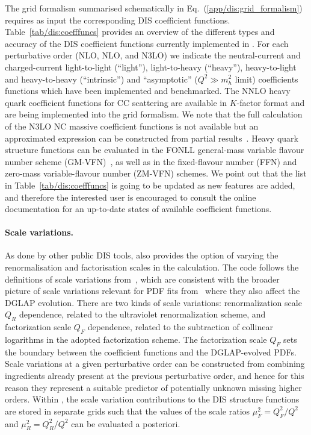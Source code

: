 The grid formalism summarised schematically in Eq.~(\ref{app/dis:grid_formalism})
requires as input the corresponding DIS coefficient functions.
%
Table~\ref{tab/dis:coefffuncs} provides an overview of the different types and accuracy of the DIS coefficient
functions currently implemented in \yadism.
%
For each perturbative order (NLO, NLO, and N3LO)
we indicate  the neutral-current
and charged-current light-to-light (``light''), light-to-heavy (``heavy''), heavy-to-light
and heavy-to-heavy (``intrinsic'') and ``asymptotic'' ($Q^2 \gg m_h^2$ limit)  coefficients functions
which have been implemented and benchmarked.
%
The NNLO heavy quark coefficient functions for CC scattering are available in $K$-factor format
and are being implemented into the \yadism grid formalism.
%
We note that the full calculation of the N3LO NC massive
coefficient functions is not available but an approximated expression can
be constructed from partial results~\cite{niccolo}.
%
Heavy quark structure functions can be evaluated in the FONLL
general-mass variable flavour number scheme (GM-VFN)~\cite{Forte:2010ta},
as well as in the fixed-flavour number (FFN) and zero-mass variable-flavour
number (ZM-VFN) schemes.
%
We point out that the list in Table~\ref{tab/dis:coefffuncs} is going to be updated
as new features are added, and therefore the interested user is encouraged
to consult the online documentation for an up-to-date states
of available coefficient functions.



\paragraph{Scale variations.}
%
As done by other public DIS tools, \yadism also provides
the option of varying the renormalisation and factorisation
scales in the calculation.
%
The code follows
the definitions of scale variations from~\cite{vanNeerven:2000uj,vanNeerven:2001pe},
which are consistent with the broader picture of scale
variations relevant for PDF fits from~\cite{NNPDF:2019ubu} where they also affect the
DGLAP evolution.
%
There are two kinds of scale variations: renormalization scale $Q_R$ dependence, related to
the ultraviolet renormalization scheme, and factorization scale $Q_F$ dependence, 
related to the subtraction of collinear logarithms in the adopted factorization scheme.
%
The factorization scale $Q_F$ sets  the boundary between
the coefficient functions and the DGLAP-evolved PDFs.
%
Scale variations at a given perturbative order can be constructed from combining
ingredients already present at the previous perturbative order, and hence
for this reason they
represent a suitable predictor of potentially unknown missing higher orders.
%
Within \yadism, the scale variation contributions to the DIS structure
functions are stored in separate grids such that the values of the scale ratios
$\mu_F^2=Q_F^2/Q^2$ and $\mu_R^2=Q_R^2/Q^2$ can be evaluated a posteriori.

